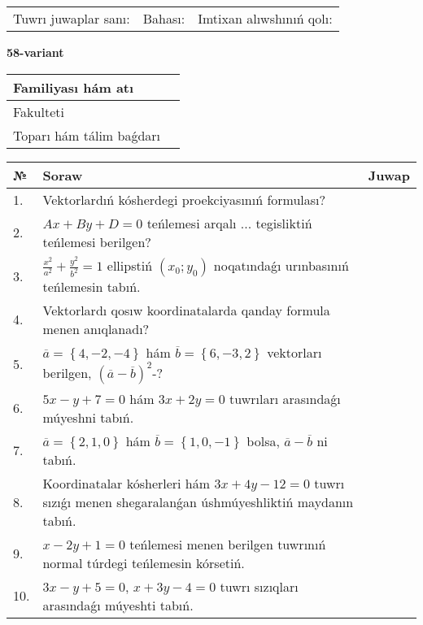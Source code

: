 \documentclass{article}
\begin{document}
\vspace{1cm}

\begin{tabular}{lll}
Tuwrı juwaplar sanı: \underline{\hspace{1.5cm}} & 
Bahası: \underline{\hspace{1.5cm}} & 
Imtixan alıwshınıń qolı: \underline{\hspace{2cm}} \\
\end{tabular}

\egroup

\newpage


\textbf{58-variant}\\

\bgroup
\def\arraystretch{1.6} %

\begin{tabular}{|m{5.7cm}|m{9.5cm}|}
\hline
Familiyası hám atı & \\
\hline
Fakulteti  & \\
\hline
Toparı hám tálim baǵdarı  & \\
\hline
\end{tabular}

\vspace{1cm}

\begin{tabular}{|m{0.7cm}|m{10cm}|m{4cm}|}
\hline
№ & Soraw & Juwap \\
\hline
1. & Vektorlardıń kósherdegi proekciyasınıń formulası? &  \\
\hline
2. & $Ax+By+D=0$ teńlemesi arqalı ... tegisliktiń teńlemesi berilgen? &  \\
\hline
3. & $\frac{x^2}{a^2}+\frac{y^2}{b^2}=1$ ellipstiń $(x_0;y_0)$ noqatındaǵı urınbasınıń teńlemesin tabıń. &  \\
\hline
4. & Vektorlardı qosıw koordinatalarda qanday formula menen anıqlanadı? &  \\
\hline
5. & $\overline{a}=\left\{ 4,-2,-4 \right\}$ hám $\overline{b}=\left\{ 6,-3, 2 \right\}$ vektorları berilgen, $(\overline{a}-\overline{b}) ^{2}$-? &  \\
\hline
6. & $5x-y+7=0$ hám $3x+2y=0$ tuwrıları arasındaǵı múyeshni tabıń. &  \\
\hline
7. & $\overline{a}=\left\{ 2, 1, 0 \right\}$ hám $\overline{b}=\left\{ 1, 0,-1 \right\}$ bolsa, $\overline{a}-\overline{b}$ ni tabıń. &  \\
\hline
8. & Koordinatalar kósherleri hám $ 3x+4y-12=0 $ tuwrı sızıǵı menen shegaralanǵan úshmúyeshliktiń maydanın tabıń. &  \\
\hline
9. & $x-2y+1=0$ teńlemesi menen berilgen tuwrınıń normal túrdegi teńlemesin kórsetiń. &  \\
\hline
10. & $3x-y+5=0$, $x+3y-4=0$ tuwrı sızıqları arasındaǵı múyeshti tabıń. &  \\
\hline
\end{tabular}
\end{document}
